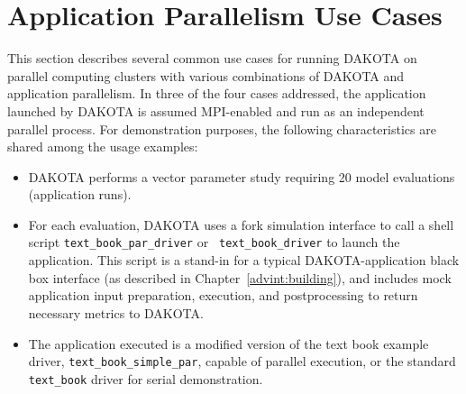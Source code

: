 \section{Application Parallelism Use Cases}\label{parallel:application}

This section describes several common use cases for running DAKOTA on
parallel computing clusters with various combinations of DAKOTA and
application parallelism.  In three of the four cases addressed, the
application launched by DAKOTA is assumed MPI-enabled and run as an
independent parallel process.  For demonstration purposes, the
following characteristics are shared among the usage examples:
\begin{itemize}
\item DAKOTA performs a vector parameter study requiring 20 model
evaluations (application runs).

\item For each evaluation, DAKOTA uses a fork simulation interface to
call a shell script {\tt text\_book\_par\_driver} or {\tt
text\_book\_driver} to launch the application.  This script is a
stand-in for a typical DAKOTA-application black box interface (as
described in Chapter~\ref{advint:building}), and includes mock
application input preparation, execution, and postprocessing to return
necessary metrics to DAKOTA.

\item The application executed is a modified version of the text book
example driver, {\tt text\_book\_simple\_par}, capable of parallel
execution, or the standard {\tt text\_book} driver for serial
demonstration.
\end{itemize}

